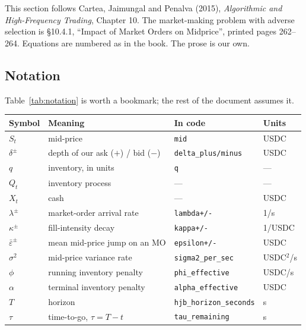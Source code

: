 \documentclass[11pt,a4paper]{article}
\newcommand{\dpm}{\delta^{\pm}}
\newcommand{\epsb}{\bar{\varepsilon}}
\newcommand{\code}[1]{\texttt{\small #1}}
\begin{document}
This section follows Cartea, Jaimungal and Penalva (2015), \emph{Algorithmic and
High-Frequency Trading}, Chapter 10. The market-making problem with adverse
selection is \S10.4.1, ``Impact of Market Orders on Midprice'', printed pages
262--264. Equations are numbered as in the book. The prose is our own.

\subsection{Notation}

Table~\ref{tab:notation} is worth a bookmark; the rest of the document assumes it.

\begin{table}[htbp]
\centering
\small
\begin{tabular}{@{}llll@{}}
\toprule
\textbf{Symbol} & \textbf{Meaning} & \textbf{In code} & \textbf{Units} \\
\midrule
$S_t$        & mid-price                              & \code{mid}                 & USDC \\
$\dpm$       & depth of our ask ($+$) / bid ($-$)     & \code{delta\_plus/minus}   & USDC \\
$q$          & inventory, in units                    & \code{q}                   & --- \\
$Q_t$        & inventory process                      & ---                        & --- \\
$X_t$        & cash                                   & ---                        & USDC \\
$\lambda^{\pm}$ & market-order arrival rate           & \code{lambda+/-}           & 1/s \\
$\kappa^{\pm}$  & fill-intensity decay                & \code{kappa+/-}            & 1/USDC \\
$\epsb^{\pm}$   & mean mid-price jump on an MO        & \code{epsilon+/-}          & USDC \\
$\sigma^{2}$ & mid-price variance rate                & \code{sigma2\_per\_sec}    & USDC$^2$/s \\
$\phi$       & running inventory penalty              & \code{phi\_effective}      & USDC/s \\
$\alpha$     & terminal inventory penalty             & \code{alpha\_effective}    & USDC \\
$T$          & horizon                                & \code{hjb\_horizon\_seconds} & s \\
$\tau$       & time-to-go, $\tau = T-t$               & \code{tau\_remaining}      & s \\

\end{tabular}
\end{table}
\end{document}
